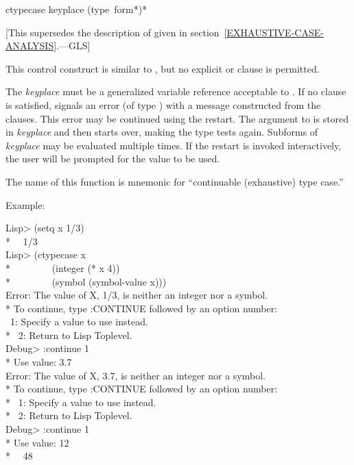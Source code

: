 \begin{defmac}
ctypecase keyplace {(type {\,form}*)}*

   [This supersedes the description of 
   given in section~\ref{EXHAUSTIVE-CASE-ANALYSIS}.---GLS]

  This control construct is similar to , but no explicit 
   or  clause is permitted.

  The {\it keyplace} must be a generalized variable reference acceptable to .
  If no clause is satisfied,  signals an error (of type )
  with a message constructed from the clauses. This error may be continued
  using the  restart. The argument to  is stored in
  {\it keyplace} and then  starts over, making the type tests again. 
  Subforms of {\it keyplace} may be evaluated multiple times. If the 
  restart is invoked interactively, the user will be prompted for the value
  to be used.
  
  The name of this function is mnemonic for ``continuable (exhaustive) 
  type case.''


  Example:
\begin{lisp}
Lisp> (setq x 1/3) \\*
~\EV\ 1/3 \\
Lisp> (ctypecase x \\*
~~~~~~~~(integer (* x 4)) \\*
~~~~~~~~(symbol (symbol-value x))) \\
Error: The value of X, 1/3, is neither an integer nor a symbol. \\*
To continue, type :CONTINUE followed by an option number: \\
~1: Specify a value to use instead. \\*
~2: Return to Lisp Toplevel. \\
Debug> :continue 1 \\*
Use value: 3.7 \\
Error: The value of X, 3.7, is neither an integer nor a symbol. \\*
To continue, type :CONTINUE followed by an option number: \\*
~1: Specify a value to use instead. \\*
~2: Return to Lisp Toplevel. \\
Debug> :continue 1 \\*
Use value: 12 \\*
~\EV\ 48
\end{lisp}
\end{defmac}


